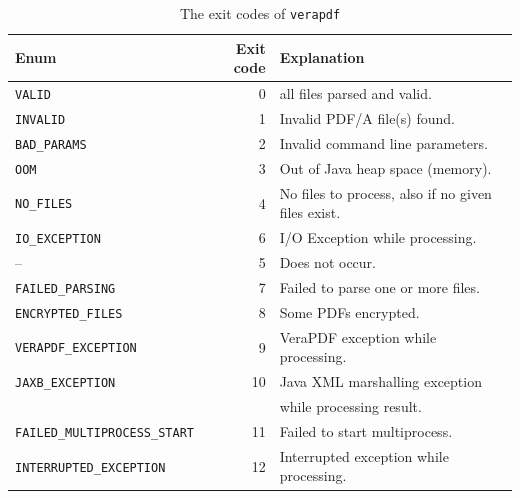 \documentclass[10pt, a4paper]{article}
\begin{document}
\begin{table}[htb]
\centering
\begin{tabular}{lrl}
  \toprule
Enum                     & Exit code & Explanation \\
\midrule%
\midrule%
\Verb|VALID|                     &  0 & all files parsed and valid. \\    %
\Verb|INVALID|                   &  1 & Invalid PDF/A file(s) found. \\
\Verb|BAD_PARAMS|                &  2 & Invalid command line parameters. \\
\Verb|OOM|                       &  3 & Out of Java heap space (memory). \\
\Verb|NO_FILES|                  &  4 & No files to process, also if no given files exist. \\%
\Verb|IO_EXCEPTION|              &  6 & I/O Exception while processing. \\{}
--                               &  5 & Does not occur. \\
\Verb|FAILED_PARSING|            &  7 & Failed to parse one or more files. \\
\Verb|ENCRYPTED_FILES|           &  8 & Some PDFs encrypted. \\%
\Verb|VERAPDF_EXCEPTION|         &  9 & VeraPDF exception while processing. \\
\Verb|JAXB_EXCEPTION|            & 10 & Java XML marshalling exception \\
                                 &    &while processing result. \\
\Verb|FAILED_MULTIPROCESS_START| & 11 & Failed to start multiprocess. \\
\Verb|INTERRUPTED_EXCEPTION|     & 12 & Interrupted exception while processing. \\
\bottomrule%
\end{tabular}
\caption{\label{tab:exitCodesVeraPdf}The exit codes of \texttt{verapdf}}
\end{table}
\end{document}
